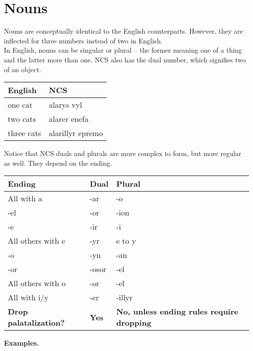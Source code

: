 \section{Nouns}

Nouns are conceptually identical to the English counterparts. However, they are inflected for three numbers instead of two in English. \\

In English, nouns can be singular or plural -- the former meaning one of a thing and the latter more than one. NCS also has the dual number, which signifies two of an object.

\begin{center}
  \begin{tabular}{|l|l|}
    \hline
    \textbf{English} & \textbf{NCS} \\ \hline
    one cat & alarys vyl \\ \hline
    two cats & alarer enefa \\ \hline
    three cats & alarillyr epremo \\ \hline
  \end{tabular}
\end{center}

Notice that NCS duals and plurals are more complex to form, but more regular as well. They depend on the ending.

\begin{center}
  \begin{tabular}{|p{4cm}|p{4cm}|p{4cm}|}
    \hline
    \textbf{Ending} & \textbf{Dual} & \textbf{Plural} \\ \hline
    All with a & -ar & -o \\ \hline
    -el & -or & -ion \\
    -e & -ir & -i \\
    All others with e & -yr & e to y \\ \hline
    -o & -yn & -an \\
    -or & -osor & -el \\
    All others with o & -or & -el \\ \hline
    All with i/y & -er & -illyr \\ \hline
    \textbf{Drop palatalization?} & \textbf{Yes} & \textbf{No, unless ending rules require dropping} \\ \hline
  \end{tabular}
\end{center}

\textbf{Examples.}

